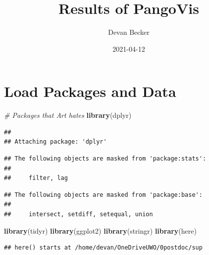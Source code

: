 \documentclass[
]{article}
\title{Results of PangoVis}
\author{Devan Becker}
\date{2021-04-12}
\newenvironment{Shaded}{\begin{snugshade}}{\end{snugshade}}
\newcommand{\CommentTok}[1]{\textcolor[rgb]{0.56,0.35,0.01}{\textit{#1}}}
\newcommand{\KeywordTok}[1]{\textcolor[rgb]{0.13,0.29,0.53}{\textbf{#1}}}
\newcommand{\NormalTok}[1]{#1}
\begin{document}
\maketitle

\hypertarget{load-packages-and-data}{%
\section{Load Packages and Data}\label{load-packages-and-data}}

\begin{Shaded}
\begin{Highlighting}[]
\CommentTok{\# Packages that Art hates}
\KeywordTok{library}\NormalTok{(dplyr)}
\end{Highlighting}
\end{Shaded}

\begin{verbatim}
## 
## Attaching package: 'dplyr'
\end{verbatim}

\begin{verbatim}
## The following objects are masked from 'package:stats':
## 
##     filter, lag
\end{verbatim}

\begin{verbatim}
## The following objects are masked from 'package:base':
## 
##     intersect, setdiff, setequal, union
\end{verbatim}

\begin{Shaded}
\begin{Highlighting}[]
\KeywordTok{library}\NormalTok{(tidyr)}
\KeywordTok{library}\NormalTok{(ggplot2)}
\KeywordTok{library}\NormalTok{(stringr)}
\KeywordTok{library}\NormalTok{(here)}
\end{Highlighting}
\end{Shaded}

\begin{verbatim}
## here() starts at /home/devan/OneDriveUWO/0postdoc/sup
\end{verbatim}
\end{document}
